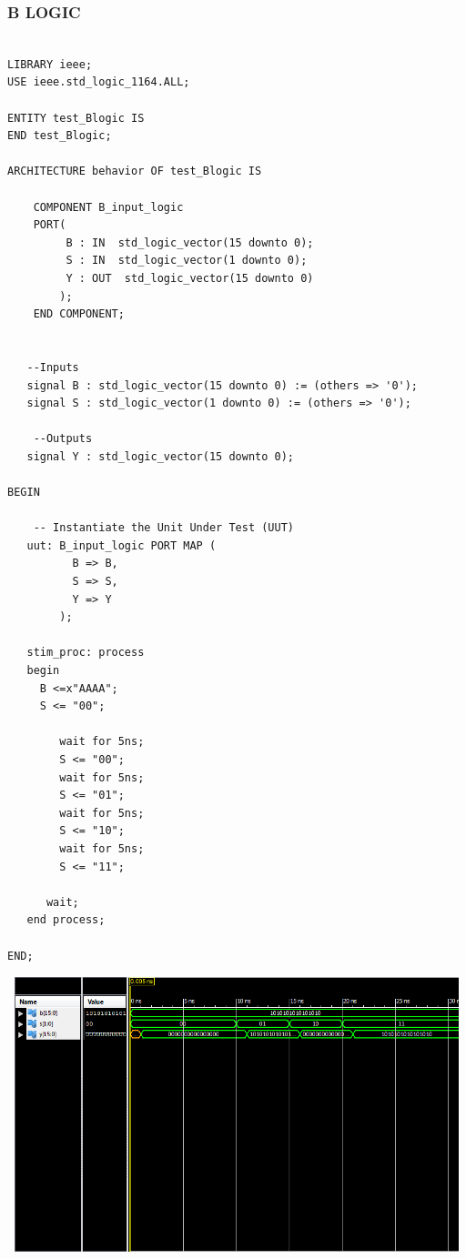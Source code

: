 \documentclass{article}
\begin{document}
\subsubsection{B LOGIC}\label{sec:result}

\begin{lstlisting}

LIBRARY ieee;
USE ieee.std_logic_1164.ALL;

ENTITY test_Blogic IS
END test_Blogic;
 
ARCHITECTURE behavior OF test_Blogic IS 

    COMPONENT B_input_logic
    PORT(
         B : IN  std_logic_vector(15 downto 0);
         S : IN  std_logic_vector(1 downto 0);
         Y : OUT  std_logic_vector(15 downto 0)
        );
    END COMPONENT;
    

   --Inputs
   signal B : std_logic_vector(15 downto 0) := (others => '0');
   signal S : std_logic_vector(1 downto 0) := (others => '0');

 	--Outputs
   signal Y : std_logic_vector(15 downto 0);

BEGIN
 
	-- Instantiate the Unit Under Test (UUT)
   uut: B_input_logic PORT MAP (
          B => B,
          S => S,
          Y => Y
        );

   stim_proc: process
   begin		
     B <=x"AAAA";
     S <= "00";

		wait for 5ns;
		S <= "00";
		wait for 5ns;
		S <= "01";
		wait for 5ns;
		S <= "10";
		wait for 5ns;
		S <= "11";
		
      wait;
   end process;

END;
\end{lstlisting}
\includegraphics[width=16cm, height=8cm]{test_Blogic.png}
\pagebreak
\end{document}
